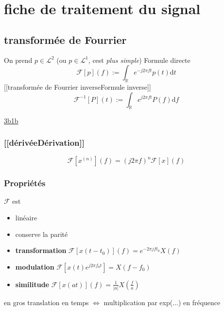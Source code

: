 \documentclass[
]{article}
\author{}
\date{}
\providecommand{\tightlist}{%
  \setlength{\itemsep}{0pt}\setlength{\parskip}{0pt}}
\begin{document}
\hypertarget{fiche-de-traitement-du-signal}{%
\section{fiche de traitement du
signal}\label{fiche-de-traitement-du-signal}}

\hypertarget{transformuxe9e-de-fourrier}{%
\subsection{transformée de Fourrier}\label{transformuxe9e-de-fourrier}}

On prend \(p \in \mathcal{L}^2\) (ou \(p \in \mathcal{L}^1\),
c\textquotesingle est \emph{plus simple}) Formule directe \[
\mathcal{F}[p](f) := \int_\mathbb{R} e^{-j2\pi f t} p(t) \mathrm{d}t
\] {[}{[}transformée de Fourrier inverse\textbar Formule inverse{]}{]}
\[
\mathcal{F^{-1}}[P](t) := \int_\mathbb{R} e^{j2\pi f t} P(f) \mathrm{d}f
\]

\href{https://youtube.com/watch?v=spUNpyF58BY}{3b1b}

\hypertarget{duxe9rivuxe9eduxe9rivation}{%
\subsubsection{{[}{[}dérivée\textbar Dérivation{]}{]}}\label{duxe9rivuxe9eduxe9rivation}}

\[
\mathcal{F}[x^{(n)}](f) = (j2\pi f)^n \mathcal{F}[x](f)
\]

\hypertarget{propriuxe9tuxe9s}{%
\subsubsection{Propriétés}\label{propriuxe9tuxe9s}}

\(\mathcal{F}\) est

\begin{itemize}
\tightlist
\item
  linéaire
\item
  conserve la parité
\item
  \textbf{transformation}
  \(\mathcal{F}[x(t-t_0)](f) = e^{-2\pi j f t_0} X(f)\)
\item
  \textbf{modulation} \(\mathcal{F}[x(t)e^{j2\pi f_0 t}] = X(f-f_0)\)
\item
  \textbf{similitude}
  \(\mathcal{F}[x(at)](f) = \frac{1}{|a|} X(\frac{f}{a})\)
\end{itemize}

en gros translation en temps \(\iff\) multiplication par exp(...) en
fréquence
\end{document}
